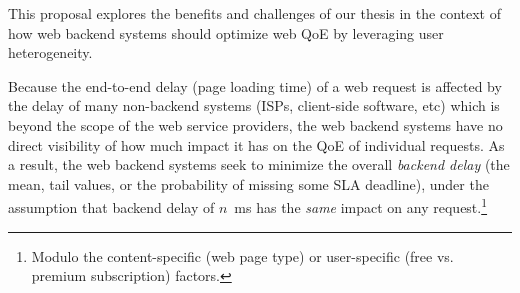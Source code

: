 This proposal explores the benefits and challenges of our thesis in the context of how web backend systems should optimize web QoE by leveraging user heterogeneity. 

Because the end-to-end delay (page loading time) of a web request is affected by the delay of many non-backend systems (ISPs, client-side software, etc) which is beyond the scope of the web service providers, the web backend systems have no direct visibility of how much impact it has on the QoE of individual requests.
As a result, the web backend systems seek to minimize the overall {\em backend delay} (\eg the mean, tail values, or the probability of missing some SLA deadline), under the assumption that backend delay of $n$~ms has the {\em same} impact on any request.\footnote{Modulo the content-specific (\eg web page type) or user-specific (\eg free vs. premium subscription) factors.}


